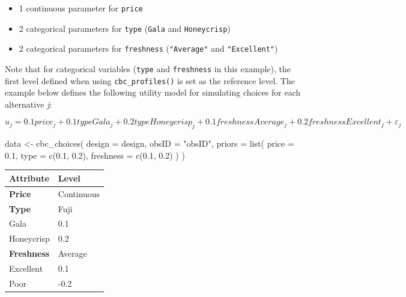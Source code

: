 \documentclass[
  12pt,
]{article}
\newenvironment{Shaded}{\begin{snugshade}}{\end{snugshade}}
\newcommand{\AttributeTok}[1]{\textcolor[rgb]{0.77,0.63,0.00}{#1}}
\newcommand{\FloatTok}[1]{\textcolor[rgb]{0.00,0.00,0.81}{#1}}
\newcommand{\FunctionTok}[1]{\textcolor[rgb]{0.00,0.00,0.00}{#1}}
\newcommand{\NormalTok}[1]{#1}
\newcommand{\OtherTok}[1]{\textcolor[rgb]{0.56,0.35,0.01}{#1}}
\newcommand{\StringTok}[1]{\textcolor[rgb]{0.31,0.60,0.02}{#1}}
\providecommand{\tightlist}{%
  \setlength{\itemsep}{0pt}\setlength{\parskip}{0pt}}
\begin{document}
\begin{itemize}
\tightlist
\item
  1 continuous parameter for \texttt{price}
\item
  2 categorical parameters for \texttt{type}
  (\texttt{\textquotesingle{}Gala\textquotesingle{}} and
  \texttt{\textquotesingle{}Honeycrisp\textquotesingle{}})
\item
  2 categorical parameters for \texttt{freshness} (\texttt{"Average"}
  and \texttt{"Excellent"})
\end{itemize}

Note that for categorical variables (\texttt{type} and
\texttt{freshness} in this example), the first level defined when using
\texttt{cbc\_profiles()} is set as the reference level. The example
below defines the following utility model for simulating choices for
each alternative \emph{j}:

\[
u_j = 0.1price_j + 0.1typeGala_j + 0.2typeHoneycrisp_j + 0.1freshnessAverage_j + 0.2freshnessExcellent_j + \varepsilon_j
\]

\begin{Shaded}
\begin{Highlighting}[]
\NormalTok{data }\OtherTok{\textless{}{-}} \FunctionTok{cbc\_choices}\NormalTok{(}
  \AttributeTok{design =}\NormalTok{ design,}
  \AttributeTok{obsID =} \StringTok{"obsID"}\NormalTok{,}
  \AttributeTok{priors =} \FunctionTok{list}\NormalTok{(}
    \AttributeTok{price     =} \FloatTok{0.1}\NormalTok{,}
    \AttributeTok{type      =} \FunctionTok{c}\NormalTok{(}\FloatTok{0.1}\NormalTok{, }\FloatTok{0.2}\NormalTok{),}
    \AttributeTok{freshness =} \FunctionTok{c}\NormalTok{(}\FloatTok{0.1}\NormalTok{, }\FloatTok{0.2}\NormalTok{)}
\NormalTok{  )}
\NormalTok{)}
\end{Highlighting}
\end{Shaded}

\begin{longtable}[]{@{}ll@{}}
\toprule
Attribute & Level \\
\midrule
\endhead
\textbf{Price} & Continuous \\
\textbf{Type} & Fuji \\
Gala & 0.1 \\
Honeycrisp & 0.2 \\
\textbf{Freshness} & Average \\
Excellent & 0.1 \\
Poor & -0.2 \\
\bottomrule
\end{longtable}
\end{document}
